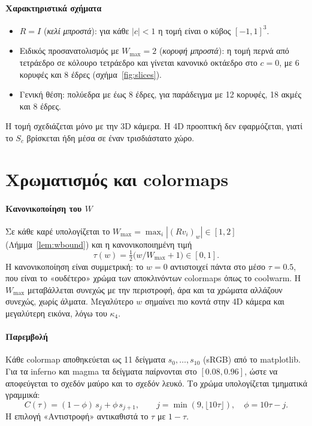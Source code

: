 \documentclass[10pt,a4paper]{article}
\theoremstyle{plain}
\theoremstyle{definition}
\newcommand{\eng}[1]{\textenglish{#1}}
\begin{document}
\paragraph{Χαρακτηριστικά σχήματα}
\begin{itemize}
\item $R=I$ (\emph{κελί μπροστά}): για κάθε $|c|<1$ η τομή είναι ο κύβος $[-1,1]^3$.
\item Ειδικός προσανατολισμός με $W_{\max}=2$ (\emph{κορυφή μπροστά}): η τομή περνά από τετράεδρο σε κόλουρο τετράεδρο και γίνεται κανονικό οκτάεδρο στο $c=0$, με 6 κορυφές και 8 έδρες (σχήμα~\ref{fig:slices}).
\item Γενική θέση: πολύεδρα με έως 8 έδρες, για παράδειγμα με 12 κορυφές, 18 ακμές και 8 έδρες.
\end{itemize}
Η τομή σχεδιάζεται μόνο με την 3D κάμερα. Η 4D προοπτική δεν εφαρμόζεται, γιατί το $S_c$ βρίσκεται ήδη μέσα σε έναν τρισδιάστατο χώρο.

\section{Χρωματισμός και \eng{colormaps}}
\paragraph{Κανονικοποίηση του $W$} Σε κάθε καρέ υπολογίζεται το $W_{\max}=\max_i|(Rv_i)_w|\in[1,2]$ (Λήμμα~\ref{lem:wbound}) και η κανονικοποιημένη τιμή
\[
\tau(w)=\tfrac12\bigl(w/W_{\max}+1\bigr)\in[0,1].
\]
Η κανονικοποίηση είναι συμμετρική: το $w=0$ αντιστοιχεί πάντα στο μέσο $\tau=0.5$, που είναι το «ουδέτερο» χρώμα των αποκλινόντων \eng{colormaps} όπως το \eng{coolwarm}. Η $W_{\max}$ μεταβάλλεται συνεχώς με την περιστροφή, άρα και τα χρώματα αλλάζουν συνεχώς, χωρίς άλματα. Μεγαλύτερο $w$ σημαίνει πιο κοντά στην 4D κάμερα και μεγαλύτερη εικόνα, λόγω του $\kappa_4$.

\paragraph{Παρεμβολή} Κάθε \eng{colormap} αποθηκεύεται ως 11 δείγματα $s_0,\dots,s_{10}$ (sRGB) από το \eng{matplotlib}. Για τα \eng{inferno} και \eng{magma} τα δείγματα παίρνονται στο $[0.08,0.96]$, ώστε να αποφεύγεται το σχεδόν μαύρο και το σχεδόν λευκό. Το χρώμα υπολογίζεται τμηματικά γραμμικά:
\[
C(\tau)=(1-\phi)\,s_j+\phi\,s_{j+1},\qquad j=\min(9,\lfloor10\tau\rfloor),\quad \phi=10\tau-j .
\]
Η επιλογή «Αντιστροφή» αντικαθιστά το $\tau$ με $1-\tau$.
\end{document}
